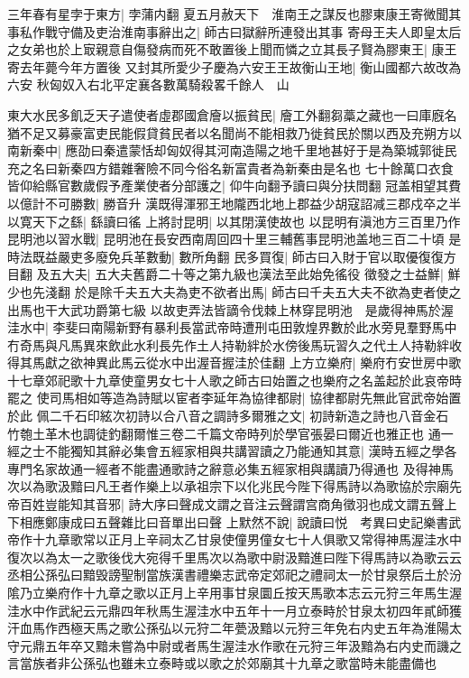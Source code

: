 三年春有星孛于東方|{
	孛蒲内翻}
夏五月赦天下　淮南王之謀反也膠東康王寄微聞其事私作戰守備及吏治淮南事辭出之|{
	師古曰獄辭所連發出其事}
寄母王夫人即皇太后之女弟也於上㝡親意自傷發病而死不敢置後上聞而憐之立其長子賢為膠東王|{
	康王寄去年薨今年方置後}
又封其所愛少子慶為六安王王故衡山王地|{
	衡山國都六故改為六安}
秋匈奴入右北平定襄各數萬騎殺畧千餘人　山

東大水民多飢乏天子遣使者虛郡國倉廥以振貧民|{
	廥工外翻芻藁之藏也一曰庫廐名}
猶不足又募豪富吏民能假貸貧民者以名聞尚不能相救乃徙貧民於關以西及充朔方以南新秦中|{
	應劭曰秦遣蒙恬却匈奴得其河南造陽之地千里地甚好于是為築城郭徙民充之名曰新秦四方錯雜奢險不同今俗名新富貴者為新秦由是名也}
七十餘萬口衣食皆仰給縣官數歲假予產業使者分部護之|{
	仰牛向翻予讀曰與分扶問翻}
冠盖相望其費以億計不可勝數|{
	勝音升}
漢既得渾邪王地隴西北地上郡益少胡寇詔减三郡戍卒之半以寛天下之繇|{
	繇讀曰徭}
上將討昆明|{
	以其閉漢使故也}
以昆明有滇池方三百里乃作昆明池以習水戰|{
	昆明池在長安西南周回四十里三輔舊事昆明池盖地三百二十頃}
是時法既益嚴吏多廢免兵革數動|{
	數所角翻}
民多買復|{
	師古曰入財于官以取優復復方目翻}
及五大夫|{
	五大夫舊爵二十等之第九級也漢法至此始免徭役}
徵發之士益鮮|{
	鮮少也先淺翻}
於是除千夫五大夫為吏不欲者出馬|{
	師古曰千夫五大夫不欲為吏者使之出馬也干大武功爵第七級}
以故吏弄法皆謫令伐棘上林穿昆明池　是歲得神馬於渥洼水中|{
	李斐曰南陽新野有暴利長當武帝時遭刑屯田敦煌界數於此水旁見羣野馬中冇奇馬與凡馬異來飲此水利長先作土人持勒絆於水傍後馬玩習久之代土人持勒絆收得其馬獻之欲神異此馬云從水中出渥音握洼於佳翻}
上方立樂府|{
	樂府冇安世房中歌十七章郊祀歌十九章使童男女七十人歌之師古曰始置之也樂府之名盖起於此哀帝時罷之}
使司馬相如等造為詩賦以宦者李延年為協律都尉|{
	協律都尉先無此官武帝始置於此}
佩二千石印絃次初詩以合八音之調詩多爾雅之文|{
	初詩新造之詩也八音金石竹匏土革木也調徒釣翻爾惟三卷二千篇文帝時列於學官張晏曰爾近也雅正也}
通一經之士不能獨知其辭必集會五經家相與共講習讀之乃能通知其意|{
	漢時五經之學各專門名家故通一經者不能盡通歌詩之辭意必集五經家相與講讀乃得通也}
及得神馬次以為歌汲黯曰凡王者作樂上以承祖宗下以化兆民今陛下得馬詩以為歌協於宗廟先帝百姓豈能知其音邪|{
	詩大序曰聲成文謂之音注云聲謂宫商角徵羽也成文謂五聲上下相應鄭康成曰五聲雜比曰音單出曰聲}
上默然不說|{
	說讀曰悦　考異曰史記樂書武帝作十九章歌常以正月上辛祠太乙甘泉使僮男僮女七十人俱歌又常得神馬渥洼水中復次以為太一之歌後伐大宛得千里馬次以為歌中尉汲黯進曰陛下得馬詩以為歌云云丞相公孫弘曰黯毁謗聖制當族漢書禮樂志武帝定郊祀之禮祠太一於甘泉祭后土於汾隂乃立樂府作十九章之歌以正月上辛用事甘泉圜丘按天馬歌本志云元狩三年馬生渥洼水中作武紀云元鼎四年秋馬生渥洼水中五年十一月立泰畤於甘泉太初四年貳師獲汗血馬作西極天馬之歌公孫弘以元狩二年甍汲黯以元狩三年免右内史五年為淮陽太守元鼎五年卒又黯未嘗為中尉或者馬生渥洼水作歌在元狩三年汲黯為右内史而譏之言當族者非公孫弘也雖未立泰畤或以歌之於郊廟其十九章之歌當時未能盡備也}
